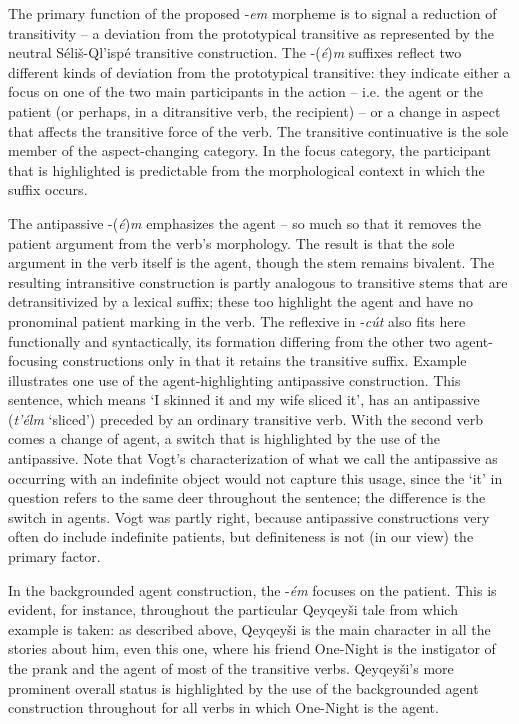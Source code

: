 \documentclass[output=paper,colorlinks,citecolor=brown]{langscibook}
\begin{document}
The primary function of the proposed -\emph{em} morpheme is to signal
a reduction of transitivity -- a deviation from the prototypical
transitive as represented by the neutral S\'eli\v{s}-Ql'isp\'e
transitive construction.  The -({\em \'e}){\em m} suffixes reflect two
different kinds of deviation from the prototypical transitive: they
indicate either a focus on one of the two main participants in the
action -- i.e. the agent or the patient (or perhaps, in a
ditransitive verb, the recipient) -- or a change in aspect that
affects the transitive force of the verb.  The transitive continuative
is the sole member of the aspect-changing category.  In the focus
category, the participant that is highlighted is predictable from the
morphological context in which the suffix occurs.


The antipassive -(\emph{\'e})\emph{m} emphasizes the agent -- so much
so that it removes the patient argument from the verb's morphology.
The result is that the sole argument in the verb itself is the agent,
though the stem remains bivalent.  The resulting intransitive
construction is partly analogous to transitive stems that are
detransitivized by a lexical suffix; these too highlight the agent and
have no pronominal patient marking in the verb.  The reflexive in
-\emph{c\'ut} also fits here functionally and syntactically, its
formation differing from the other two agent-focusing constructions
only in that it retains the transitive suffix.  Example  illustrates
one use of the agent-highlighting antipassive construction.  This
sentence, which means `I skinned it and my wife sliced it', has an
antipassive (\emph{t'\'elm} `sliced') preceded by an ordinary
transitive verb.  With the second verb comes a change of agent, a
switch that is highlighted by the use of the antipassive.  Note that
Vogt's characterization of what we call the antipassive as occurring
with an indefinite object \citeyearpar[31]{Vogt:1940} would not capture this usage, since the `it' in question refers to the same deer throughout the
sentence; the difference is the switch in agents.  Vogt was partly
right, because antipassive constructions very often do include
indefinite patients, but definiteness is not (in our view) the primary
factor.


In the backgrounded agent construction, the -\emph{\'em} focuses on the
patient.  This is evident, for instance, throughout the particular
Qeyqey\v{s}i tale from which example  is taken: as described above,
Qeyqey\v{s}i is the main character in all the stories about him, even
this one, where his friend One-Night is the instigator of the prank
and the agent of most of the transitive verbs.  Qeyqey\v{s}i's more
prominent overall status is highlighted by the use of the backgrounded
agent construction throughout for all verbs in which One-Night is the
agent.
\end{document}

